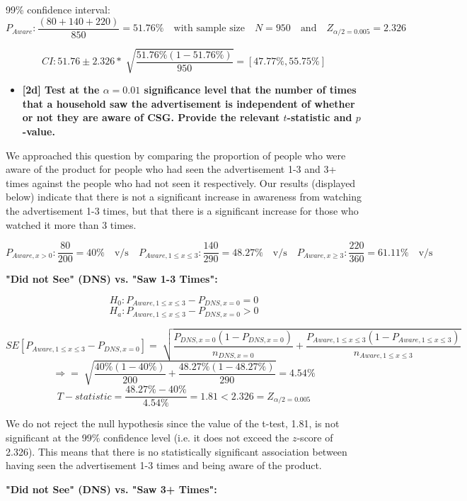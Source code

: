 \documentclass[10pt, oneside,spanish]{article}
\begin{document}
99\% confidence interval:
$$ P_{Aware}:\frac{(80+140+220)}{850} = 51.76\% \quad \textrm{with sample size} \quad N = 950 \quad \textrm{and} \quad Z_{\alpha / 2 =0.005} = 2.326 $$

$$ CI: 51.76 \pm 2.326 *  \sqrt[]{\frac{ 51.76 \%  (1 - 51.76 \% )}{950} } = [47.77\% , 55.75\% ] $$


\begin{itemize}
\item \textbf{ [2d]   Test at the $\alpha = 0.01$ significance level that the number of times that a household saw the advertisement is independent of whether or not they are aware of CSG. Provide the relevant $t$-statistic and $p$-value.     }
\end{itemize}

We approached this question by comparing the proportion of people who were aware of the product for people who had seen the advertisement 1-3 and 3+ times against the people who had not seen it respectively. Our results (displayed below) indicate that there is not a significant increase in awareness from watching the advertisement 1-3 times, but that there is a significant increase for those who watched it more than 3 times. 

$$ P_{Aware,x>0}:\frac{80}{200} = 40\% \quad \textrm{v/s} \quad P_{Aware,1\leq x\leq 3}:\frac{140}{290} = 48.27\% \quad \textrm{v/s} \quad P_{Aware,x \geq 3}:\frac{220}{360} = 61.11\% \quad \textrm{v/s} \quad $$


\textbf{"Did not See" (DNS) vs. "Saw 1-3 Times":}

$$ H_0 : P_{Aware,1\leq x\leq 3} - P_{DNS, x=0} =  0 $$
$$ H_a : P_{Aware,1\leq x\leq 3} - P_{DNS, x=0} >  0 $$

$$ SE[P_{Aware,1\leq x\leq 3} - P_{DNS, x=0}] = \sqrt[]{\frac{P_{DNS, x=0} (1 - P_{DNS, x=0})}{n_{DNS, x=0}} + \frac{P_{Aware,1\leq x\leq 3} (1 - P_{Aware,1\leq x\leq 3})}{n_{Aware,1\leq x\leq 3}} } $$
$$ \Rightarrow = \sqrt[]{\frac{ 40\%  (1 - 40\% )}{200} + \frac{ 48.27\%  (1 - 48.27\% )}{290} } = 4.54\% $$
$$T-statistic = \frac{48.27\% - 40\%}{4.54\%} = 1.81 < 2.326  =  Z_{\alpha / 2 =0.005}  $$

We do not reject the null hypothesis since the value of the t-test, 1.81, is not significant at the 99\% confidence level (i.e. it does not exceed the $z$-score of 2.326). This means that there is no statistically significant association between having seen the advertisement 1-3 times and being aware of the product.


\textbf{"Did not See" (DNS) vs. "Saw 3+ Times":}
\end{document}
